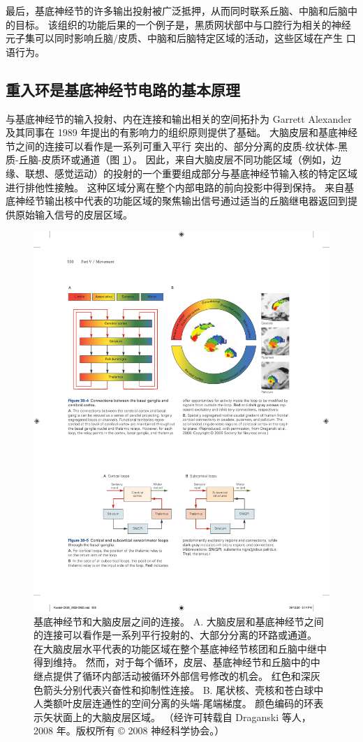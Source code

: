 最后，基底神经节的许多输出投射被广泛抵押，从而同时联系丘脑、中脑和后脑中的目标。 该组织的功能后果的一个例子是，黑质网状部中与口腔行为相关的神经元子集可以同时影响丘脑/皮质、中脑和后脑特定区域的活动，这些区域在产生 口语行为。

\subsection{重入环是基底神经节电路的基本原理}
与基底神经节的输入投射、内在连接和输出相关的空间拓扑为 Garrett Alexander 及其同事在 1989 年提出的有影响力的组织原则提供了基础。
大脑皮层和基底神经节之间的连接可以看作是一系列可重入平行 突出的、部分分离的皮质-纹状体-黑质-丘脑-皮质环或通道（图 \ref{fig:38_4}）。 
因此，来自大脑皮层不同功能区域（例如，边缘、联想、感觉运动）的投射的一个重要组成部分与基底神经节输入核的特定区域进行排他性接触。 这种区域分离在整个内部电路的前向投影中得到保持。 来自基底神经节输出核中代表的功能区域的聚焦输出信号通过适当的丘脑继电器返回到提供原始输入信号的皮层区域。

\begin{figure}[htbp]
	\centering
	\includegraphics[width=0.95\linewidth]{chap38/fig_38_4}
	\caption{基底神经节和大脑皮层之间的连接。 A. 大脑皮层和基底神经节之间的连接可以看作是一系列平行投射的、大部分分离的环路或通道。 在大脑皮层水平代表的功能区域在整个基底神经节核团和丘脑中继中得到维持。 然而，对于每个循环，皮层、基底神经节和丘脑中的中继点提供了循环内部活动被循环外部信号修改的机会。 红色和深灰色箭头分别代表兴奋性和抑制性连接。 B. 尾状核、壳核和苍白球中人类额叶皮层连通性的空间分离的头端-尾端梯度。 颜色编码的环表示矢状面上的大脑皮层区域。 （经许可转载自 Draganski 等人，2008 年。版权所有 © 2008 神经科学协会。）}
	\label{fig:38_4}
\end{figure}

